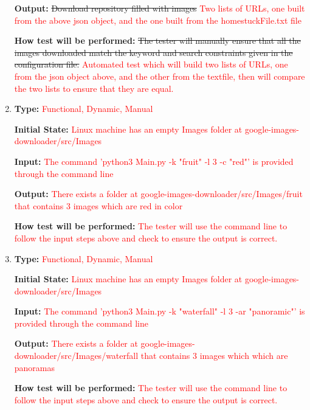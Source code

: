 \documentclass[12pt, titlepage]{article}
\begin{document}
\begin{enumerate}[label=FR-SQ\arabic*:, wide=0pt, leftmargin=*]
\textbf{Output:} \sout{Download repository filled with images}
\textcolor{red}{Two lists of URLs, one built from the above json object, and the one built from the homestuckFile.txt file}
					
\textbf{How test will be performed:} \sout{The tester will manually ensure that all the images downloaded match 
the keyword and search constraints given in the configuration file.}
\textcolor{red}{Automated test which will build two lists of URLs, one from the json object above, and the other 
from the textfile, then will compare the two lists to ensure that they are equal.}

\item \phantom{empty}

\textbf{Type:} \textcolor{red}{Functional, Dynamic, Manual}

\textbf{Initial State:} \textcolor{red}{Linux machine has an empty Images folder at google-images-downloader/src/Images}

\textbf{Input:} \textcolor{red}{The command 'python3 Main.py -k "fruit" -l 3 -c "red"' is provided through the command line}

\textbf{Output:} \textcolor{red}{There exists a folder at google-images-downloader/src/Images/fruit that contains 3 images 
which are red in color}

\textbf{How test will be performed:} \textcolor{red}{The tester will use the command line to follow the input steps above and 
check to ensure the output is correct.}

\item \phantom{empty}

\textbf{Type:} \textcolor{red}{Functional, Dynamic, Manual}

\textbf{Initial State:} \textcolor{red}{Linux machine has an empty Images folder at google-images-downloader/src/Images}

\textbf{Input:} \textcolor{red}{The command 'python3 Main.py -k "waterfall" -l 3 -ar "panoramic"' is provided through the command line}

\textbf{Output:} \textcolor{red}{There exists a folder at google-images-downloader/src/Images/waterfall that contains 3 images 
which which are panoramas}

\textbf{How test will be performed:} \textcolor{red}{The tester will use the command line to follow the input steps above and 
check to ensure the output is correct.}

\end{enumerate}
\end{document}
